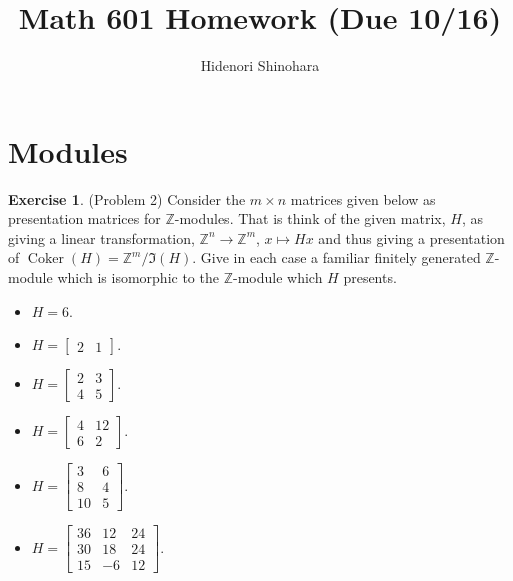 \documentclass[12pt, psamsfonts]{amsart}
\theoremstyle{definition}
\newtheorem*{exer}{Exercise}
\theoremstyle{remark}
\DeclareMathOperator{\Coker}{Coker}
\numberwithin{equation}{section}
\begin{document}
\title{Math 601 Homework (Due 10/16)}
\author{Hidenori Shinohara}
\maketitle

\tableofcontents

\section{Modules}

\begin{exer}{(Problem 2)}
  Consider the $m \times n$ matrices given below as presentation matrices for $\mathbb{Z}$-modules.
  That is think of the given matrix, $H$, as giving a linear transformation, $\mathbb{Z}^n \rightarrow \mathbb{Z}^m$, $x \mapsto Hx$ and thus giving a presentation of $\Coker(H) = \mathbb{Z}^m/\Im(H)$.
  Give in each case a familiar finitely generated $\mathbb{Z}$-module which is isomorphic to the $\mathbb{Z}$-module which $H$ presents.
  \begin{itemize}
    \item
      $H = 6$.
    \item
      $H = \begin{bmatrix} 2 & 1 \end{bmatrix}$.
    \item
      $H = \begin{bmatrix} 2 & 3 \\ 4 & 5 \end{bmatrix}$.
    \item
      $H = \begin{bmatrix} 4 & 12 \\ 6 & 2 \end{bmatrix}$.
    \item
      $H = \begin{bmatrix} 3 & 6 \\ 8 & 4 \\ 10 & 5 \end{bmatrix}$.
    \item
      $H = \begin{bmatrix} 36 & 12 & 24 \\ 30 & 18 & 24 \\ 15 & -6 & 12 \end{bmatrix}$.
  \end{itemize}
\end{exer}
\end{document}
